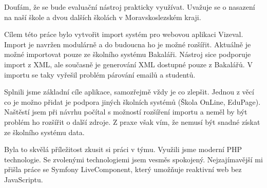 Doufám, že se bude evaluační nástroj prakticky využívat.
Uvažuje se o nasazení na naší škole a dvou dalších školách v Moravskoslezském kraji.

Cílem této práce bylo vytvořit import systém pro webovou aplikaci Vizeval.
Import je navržen modulárně a do budoucna ho je možné rozšířit.
Aktuálně je možné importovat pouze ze školního systému Bakaláři.
Nástroj sice podporuje import z XML, ale současně je generování XML dostupné pouze z Bakalářů.
V importu se taky vyřešil problém párování emailů a studentů. 

Splnili jsme základní cíle aplikace, samozřejmě vždy je co zlepšit. 
Jednou z věcí co je možno přidat je podpora jiných školních systémů (Škola OnLine, EduPage).
Naštěstí jsem při návrhu počítal s možností rozšíření importu a neměl by být problém ho rozšířit o další zdroje.
Z praxe však vím, že nemusí být snadné získat ze školního systému data.

Byla to skvělá příležitost zkusit si práci v týmu.
Využili jsme moderní PHP technologie. Se zvolenými technologiemi jsem vesměs spokojený.
Nejzajímavější mi přišla práce se Symfony LiveComponent, který umožňuje reaktivní web bez JavaScriptu.
